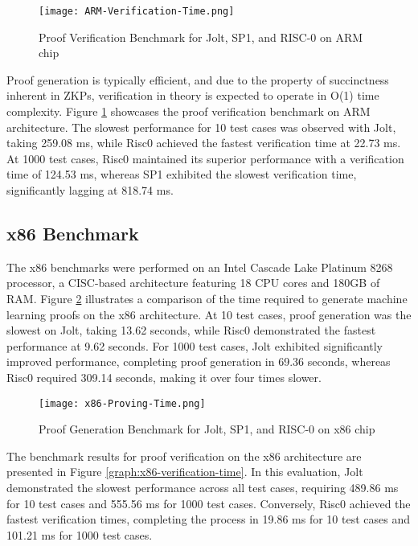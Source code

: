 \documentclass{scrartcl}
\begin{document}
\begin{figure}
	\begin{center}
		\texttt{[image: ARM-Verification-Time.png]}
	\end{center}
	\caption{Proof Verification Benchmark for Jolt, SP1, and RISC-0 on ARM chip}
	\label{graph:arm-verification-time}
\end{figure}

Proof generation is typically efficient, and due to the property of succinctness inherent in ZKPs, verification in theory is expected to operate in  O(1) time complexity. Figure \ref{graph:arm-verification-time} showcases the proof verification benchmark on ARM architecture. The slowest performance for 10 test cases was observed with Jolt, taking 259.08 ms, while Risc0 achieved the fastest verification time at 22.73 ms. At 1000 test cases, Risc0 maintained its superior performance with a verification time of 124.53 ms, whereas SP1 exhibited the slowest verification time, significantly lagging at 818.74 ms.

\subsection{x86 Benchmark}

The x86 benchmarks were performed on an Intel Cascade Lake Platinum 8268 processor, a CISC-based architecture featuring 18 CPU cores and 180GB of RAM. Figure \ref{graph:x86-proving-time} illustrates a comparison of the time required to generate machine learning proofs on the x86 architecture. At 10 test cases, proof generation was the slowest on Jolt, taking 13.62 seconds, while Risc0 demonstrated the fastest performance at 9.62 seconds. For 1000 test cases, Jolt exhibited significantly improved performance, completing proof generation in 69.36 seconds, whereas Risc0 required 309.14 seconds, making it over four times slower.

\begin{figure}
	\begin{center}
		\texttt{[image: x86-Proving-Time.png]}
	\end{center}
	\caption{Proof Generation Benchmark for Jolt, SP1, and RISC-0 on x86 chip}
	\label{graph:x86-proving-time}
\end{figure}

The benchmark results for proof verification on the x86 architecture are presented in Figure \ref{graph:x86-verification-time}. In this evaluation, Jolt demonstrated the slowest performance across all test cases, requiring 489.86 ms for 10 test cases and 555.56 ms for 1000 test cases. Conversely, Risc0 achieved the fastest verification times, completing the process in 19.86 ms for 10 test cases and 101.21 ms for 1000 test cases.
\end{document}
